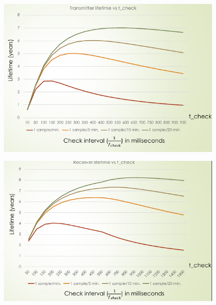 \documentclass[10pt,a4paper]{report}
\theoremstyle{definition}
\begin{document}
\begin{figure}
	\centering
	\begin{minipage}{.5\textwidth}
		\centering
		\includegraphics[width=.9\linewidth]{images/Pasted image 20230409084848.png}
		\label{fig:bmac-transmitter}
	\end{minipage}%
	\begin{minipage}{.5\textwidth}
		\centering
		\includegraphics[width=.9\linewidth]{images/Pasted image 20230409084955.png}
		\label{fig:bmac-receiver}
	\end{minipage}
\end{figure}
\end{document}
